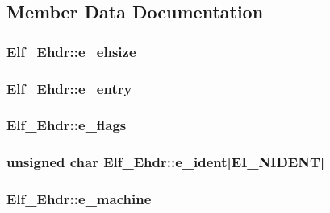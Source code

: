 \subsection{Member Data Documentation}
\hypertarget{struct_elf___ehdr_a2f6e336e9e6fd90134c8baf86770c548}{
\subsubsection[{e\+\_\+ehsize}]{ Elf\+\_\+\+Ehdr\+::e\+\_\+ehsize}}\label{struct_elf___ehdr_a2f6e336e9e6fd90134c8baf86770c548}
\hypertarget{struct_elf___ehdr_a16d86c71e10335897fe770fd83ab8678}{
\subsubsection[{e\+\_\+entry}]{ Elf\+\_\+\+Ehdr\+::e\+\_\+entry}}\label{struct_elf___ehdr_a16d86c71e10335897fe770fd83ab8678}
\hypertarget{struct_elf___ehdr_aee13223e1a74d7b6202ee826930dcda0}{
\subsubsection[{e\+\_\+flags}]{ Elf\+\_\+\+Ehdr\+::e\+\_\+flags}}\label{struct_elf___ehdr_aee13223e1a74d7b6202ee826930dcda0}
\hypertarget{struct_elf___ehdr_af7265f2071ee0e07b51fee581e6fd80f}{
\subsubsection[{e\+\_\+ident}]{\setlength{\rightskip}{0pt plus 5cm}unsigned char Elf\+\_\+\+Ehdr\+::e\+\_\+ident\mbox{[}E\+I\+\_\+\+N\+I\+D\+E\+N\+T\mbox{]}}}\label{struct_elf___ehdr_af7265f2071ee0e07b51fee581e6fd80f}
\hypertarget{struct_elf___ehdr_ad18150e5a46a0ff5dd22a80842661d7d}{
\subsubsection[{e\+\_\+machine}]{ Elf\+\_\+\+Ehdr\+::e\+\_\+machine}}\label{struct_elf___ehdr_ad18150e5a46a0ff5dd22a80842661d7d}
